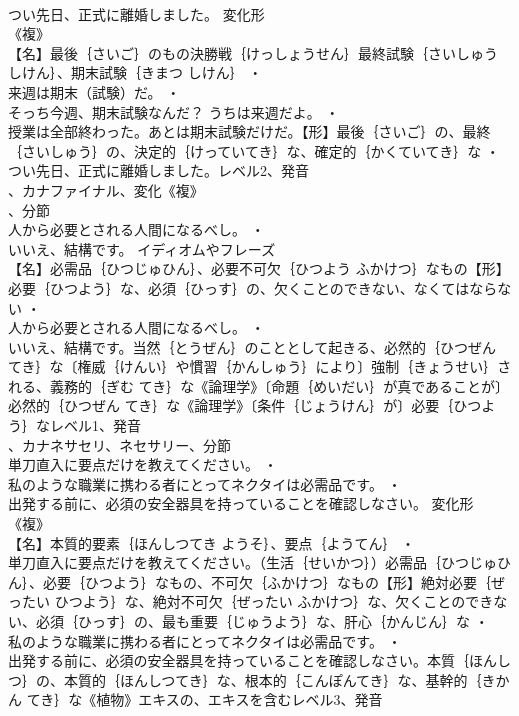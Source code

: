 \documentclass[8pt]{extreport}
\begin{document}
\begin{CJK}{UTF8}{min}
\\	つい先日、正式に離婚しました。	変化形 
\\	《複》
\\	【名】最後｛さいご｝のもの決勝戦｛けっしょうせん｝最終試験｛さいしゅう しけん｝、期末試験｛きまつ しけん｝ ・
\\	来週は期末（試験）だ。 ・
\\	そっち今週、期末試験なんだ？ うちは来週だよ。 ・
\\	授業は全部終わった。あとは期末試験だけだ。【形】最後｛さいご｝の、最終｛さいしゅう｝の、決定的｛けっていてき｝な、確定的｛かくていてき｝な ・
\\	つい先日、正式に離婚しました。レベル2、発音
\\	、カナファイナル、変化《複》
\\	、分節
\\	人から必要とされる人間になるべし。 ・
\\	いいえ、結構です。	イディオムやフレーズ 
\\	【名】必需品｛ひつじゅひん｝、必要不可欠｛ひつよう ふかけつ｝なもの【形】必要｛ひつよう｝な、必須｛ひっす｝の、欠くことのできない、なくてはならない ・
\\	人から必要とされる人間になるべし。 ・
\\	いいえ、結構です。当然｛とうぜん｝のこととして起きる、必然的｛ひつぜん てき｝な〔権威｛けんい｝や慣習｛かんしゅう｝により〕強制｛きょうせい｝される、義務的｛ぎむ てき｝な《論理学》〔命題｛めいだい｝が真であることが〕必然的｛ひつぜん てき｝な《論理学》〔条件｛じょうけん｝が〕必要｛ひつよう｝なレベル1、発音
\\	、カナネサセリ、ネセサリー、分節
\\	単刀直入に要点だけを教えてください。 ・
\\	私のような職業に携わる者にとってネクタイは必需品です。 ・
\\	出発する前に、必須の安全器具を持っていることを確認しなさい。	変化形 
\\	《複》
\\	【名】本質的要素｛ほんしつてき ようそ｝、要点｛ようてん｝ ・
\\	単刀直入に要点だけを教えてください。（生活｛せいかつ｝）必需品｛ひつじゅひん｝、必要｛ひつよう｝なもの、不可欠｛ふかけつ｝なもの【形】絶対必要｛ぜったい ひつよう｝な、絶対不可欠｛ぜったい ふかけつ｝な、欠くことのできない、必須｛ひっす｝の、最も重要｛じゅうよう｝な、肝心｛かんじん｝な ・
\\	私のような職業に携わる者にとってネクタイは必需品です。 ・
\\	出発する前に、必須の安全器具を持っていることを確認しなさい。本質｛ほんしつ｝の、本質的｛ほんしつてき｝な、根本的｛こんぽんてき｝な、基幹的｛きかん てき｝な《植物》エキスの、エキスを含むレベル3、発音

\end{CJK}
\end{document}
